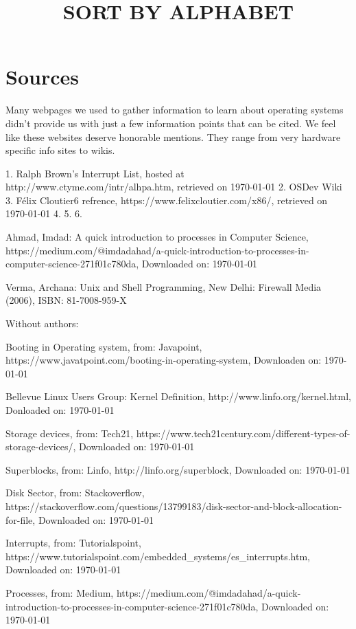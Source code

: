 \section{Sources}

Many webpages we used to gather information to learn about operating systems didn't provide us with
just a few information points that can be cited. We feel like these websites deserve honorable
mentions. They range from very hardware specific info sites to wikis.

\title{SORT BY ALPHABET}

1. Ralph Brown's Interrupt List, hosted at http://www.ctyme.com/intr/alhpa.htm, retrieved on \today
2. OSDev Wiki
3. Félix Cloutier6 refrence, https://www.felixcloutier.com/x86/, retrieved on \today
4. 
5.
6.

\begin{thebibliography}{10}

	Ahmad, Imdad: A quick introduction to processes in Computer Science,
	https://medium.com/@imdadahad/a-quick-introduction-to-processes-in-computer-science-271f01c780da,
	Downloaded on: \today

	Verma, Archana: Unix and Shell Programming,
	New Delhi: Firewall Media (2006),
	ISBN: 81-7008-959-X



Without authors:

	Booting in Operating system, from: Javapoint,
	https://www.javatpoint.com/booting-in-operating-system,
	Downloaden on: \today

	Bellevue Linux Users Group: Kernel Definition,
	http://www.linfo.org/kernel.html,
	Donloaded on: \today

	Storage devices, from: Tech21,
	https://www.tech21century.com/different-types-of-storage-devices/,
	Downloaded on: \today

	Superblocks, from: Linfo,
	http://linfo.org/superblock,
	Downloaded on: \today

	Disk Sector, from: Stackoverflow,
	https://stackoverflow.com/questions/13799183/disk-sector-and-block-allocation-for-file,
	Downloaded on: \today

	Interrupts, from: Tutorialspoint,
	https://www.tutorialspoint.com/embedded_systems/es_interrupts.htm,
	Downloaded on: \today

	Processes, from: Medium,
	https://medium.com/@imdadahad/a-quick-introduction-to-processes-in-computer-science-271f01c780da,
	Downloaded on: \today


\end{thebibliography}
